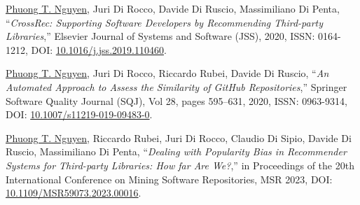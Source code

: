 \documentclass[a4paper,9pt]{article} %
\begin{document}
\begin{thebibliography}{100}
	
%	
	\underline{Phuong T. Nguyen}, Juri Di Rocco, Davide Di Ruscio, Massimiliano Di Penta, ``\emph{CrossRec: Supporting Software Developers by Recommending Third-party Libraries},'' Elsevier Journal of Systems and Software (JSS), 2020, ISSN: 0164-1212, DOI: \href{https://doi.org/10.1016/j.jss.2019.110460}{10.1016/j.jss.2019.110460}.	
	
	\underline{Phuong T. Nguyen}, Juri Di Rocco, Riccardo Rubei, Davide Di Ruscio, ``\emph{An Automated Approach to Assess the Similarity of GitHub Repositories},'' Springer Software Quality Journal (SQJ), Vol 28, pages 595–631, 2020, ISSN: 0963-9314, DOI: \href{https://doi.org/10.1007/s11219-019-09483-0}{10.1007/s11219-019-09483-0}.





	
	\underline{Phuong T. Nguyen}, Riccardo Rubei, Juri Di Rocco, Claudio Di Sipio, Davide Di Ruscio, Massimiliano Di Penta, ``\emph{Dealing with Popularity Bias in Recommender Systems for Third-party Libraries: How far Are We?},'' in Proceedings %
	of the 20th International Conference on Mining Software Repositories, MSR 2023, %
	DOI: \href{https://doi.org/10.1109/MSR59073.2023.00016}{10.1109/MSR59073.2023.00016}.%
	

\end{thebibliography}
\end{document}
